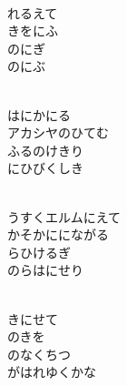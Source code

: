 \documentclass[10pt,b5j]{tarticle} %
\begin{document}
\vspace{1.5em} %
\newcommand{\linespace}{0.5em} %
\newcommand{\blocksize}{0.5\hsize} %
\newcommand{\itemmargin}{6em} %
\begin{enumerate} %
    \setlength{\itemindent}{\itemmargin} %
    \begin{minipage}[c]{\blocksize}
    
        \vspace{\linespace}
        \item~\\
        れるえて\\
        きをにふ\\
        のにぎ\\
        のにぶ
        
        \vspace{\linespace}
        \item~\\
        はにかにる\\
        アカシヤのひてむ\\
        ふるのけきり\\
        にひびくしき
        
        \vspace{\linespace}
        \item~\\
        うすくエルムにえて\\
        かそかににながる\\
        らひけるぎ\\
        のらはにせり
        
        \vspace{\linespace}
        \item~\\
        きにせて\\
        のきを\\
        のなくちつ\\
        がはれゆくかな
        

\end{minipage}
\end{enumerate}
\end{document}
